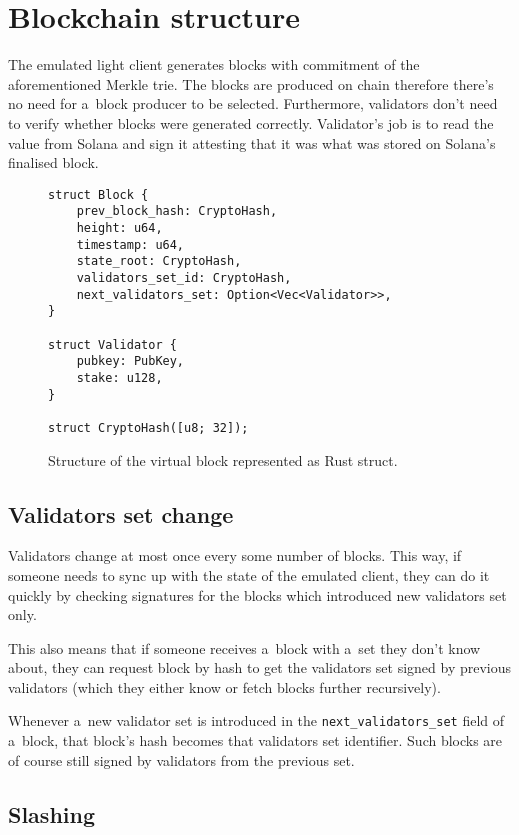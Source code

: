 \documentclass[sigplan,screen,authorversion]{acmart}
\begin{document}
\section{Blockchain structure}

The emulated light client generates blocks with commitment of the
aforementioned Merkle trie.  The blocks are produced on chain
therefore there’s no need for a~block producer to be selected.
Furthermore, validators don’t need to verify whether blocks were
generated correctly.  Validator’s job is to read the value from Solana
and sign it attesting that it was what was stored on Solana’s
finalised block.

\begin{figure}[htb]
\begin{lstlisting}
struct Block {
    prev_block_hash: CryptoHash,
    height: u64,
    timestamp: u64,
    state_root: CryptoHash,
    validators_set_id: CryptoHash,
    next_validators_set: Option<Vec<Validator>>,
}

struct Validator {
    pubkey: PubKey,
    stake: u128,
}

struct CryptoHash([u8; 32]);
\end{lstlisting}
\caption{Structure of the virtual block represented as Rust struct.}
\end{figure}

\subsection{Validators set change}

Validators change at most once every some number of blocks.  This way,
if someone needs to sync up with the state of the emulated client,
they can do it quickly by checking signatures for the blocks which
introduced new validators set only.

This also means that if someone receives a~block with a~set they don’t
know about, they can request block by hash to get the validators set
signed by previous validators (which they either know or fetch blocks
further recursively).

Whenever a~new validator set is introduced in the
\verb|next_validators_set| field of a~block, that block’s hash
becomes that validators set identifier.  Such blocks are of course
still signed by validators from the previous set.

\subsection{Slashing}
\end{document}
